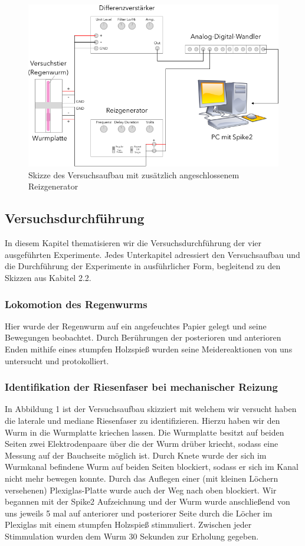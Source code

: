 \documentclass[a4paper]{article}
\begin{document}
\vspace{2.5\baselineskip}
\begin{figure}[H]
    \centering
    \captionsetup{justification=centering,margin=2cm}
    \includegraphics[scale=0.6]{images/Versuchsaufbau_Wurm_Reizgenerator.png}
    \caption{Skizze des Versuchsaufbau mit zusätzlich angeschlossenem Reizgenerator}
\end{figure}
\subsection{Versuchsdurchführung}
In diesem Kapitel thematisieren wir die Versuchsdurchführung der vier ausgeführten Experimente. Jedes Unterkapitel adressiert den Versuchsaufbau und die Durchführung der Experimente in ausführlicher Form, begleitend zu den Skizzen aus Kabitel 2.2.
\subsubsection{Lokomotion des Regenwurms}
Hier wurde der Regenwurm auf ein angefeuchtes Papier gelegt und seine Bewegungen beobachtet. Durch Berührungen der posterioren und anterioren Enden mithife eines stumpfen Holzspieß wurden seine Meidereaktionen von uns untersucht und protokolliert. 
\subsubsection{Identifikation der Riesenfaser bei mechanischer Reizung}
In Abbildung 1 ist der Versuchsaufbau skizziert mit welchem wir versucht haben die laterale und mediane Riesenfaser zu identifizieren. Hierzu haben wir den Wurm in die Wurmplatte kriechen lassen. Die Wurmplatte besitzt auf beiden Seiten zwei Elektrodenpaare über die der Wurm drüber kriecht, sodass eine Messung auf der Bauchseite möglich ist. Durch Knete wurde der sich im Wurmkanal befindene Wurm auf beiden Seiten blockiert, sodass er sich im Kanal nicht mehr bewegen konnte. Durch das Auflegen einer (mit kleinen Löchern versehenen) Plexiglas-Platte wurde auch der Weg nach oben blockiert. Wir begannen mit der Spike2 Aufzeichnung und der Wurm wurde anschließend von uns jeweils 5 mal auf anteriorer und posteriorer Seite durch die Löcher im Plexiglas mit einem stumpfen Holzspieß stimmuliert. Zwischen jeder Stimmulation wurden dem Wurm 30 Sekunden zur Erholung gegeben.
\end{document}
